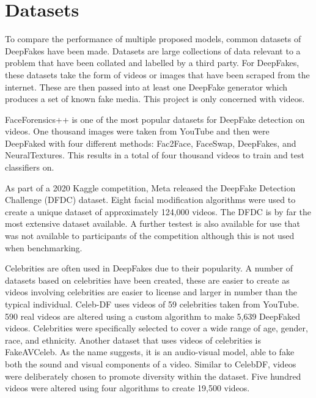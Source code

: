 \section{Datasets}
\label{sec:datasets}

To compare the performance of multiple proposed models, common datasets of DeepFakes have been made. Datasets are large collections of data relevant to a problem that have been collated and labelled by a third party. For DeepFakes, these datasets take the form of videos or images that have been scraped from the internet. These are then passed into at least one DeepFake generator which produces a set of known fake media. This project is only concerned with videos.

FaceForensics++\cite{roessler2018faceforensics}\cite{roessler2019faceforensicspp}\cite{dufour2019deepfakes} is one of the most popular datasets for DeepFake detection on videos. One thousand images were taken from YouTube and then were DeepFaked with four different methods: Fac2Face\cite{thies2016face2face}, FaceSwap\cite{kowalski2016faceswap}, DeepFakes\cite{deepfakes}, and NeuralTextures\cite{thies2019deferred}. This results in a total of four thousand videos to train and test classifiers on. 

As part of a 2020 Kaggle competition, Meta released the DeepFake Detection Challenge (DFDC) dataset\cite{dolhansky2020deepfake}. Eight facial modification algorithms were used to create a unique dataset of approximately 124,000 videos. The DFDC is by far the most extensive dataset available. A further testest is also available for use that was not available to participants of the competition although this is not used when benchmarking.

Celebrities are often used in DeepFakes due to their popularity. A number of datasets based on celebrities have been created, these are easier to create as videos involving celebrities are easier to license and larger in number than the typical individual. Celeb-DF\cite{li2020celeb} uses videos of 59 celebrities taken from YouTube. 590 real videos are altered using a custom algorithm to make 5,639 DeepFaked videos. Celebrities were specifically selected to cover a wide range of age, gender, race, and ethnicity. Another dataset that uses videos of celebrities is FakeAVCeleb\cite{khalid2021fakeavceleb}. As the name suggests, it is an audio-visual model, able to fake both the sound and visual components of a video. Similar to CelebDF, videos were deliberately chosen to promote diversity within the dataset. Five hundred videos were altered using four algorithms to create 19,500 videos.